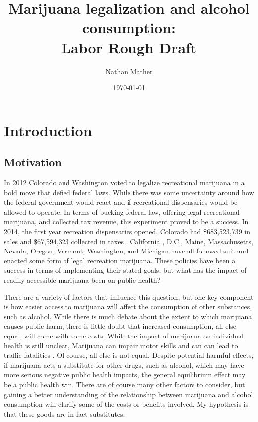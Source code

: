 \documentclass[11pt]{article}
\title{Marijuana legalization and alcohol consumption:\\
	Labor Rough Draft} %
\author{Nathan Mather} %
\date{\today} %
\begin{document}
	
	
\maketitle %

\setcounter{tocdepth}{3} %

\tableofcontents %

\section{Introduction}

\subsection{Motivation}

In 2012 Colorado and Washington voted to legalize recreational marijuana in a bold move that defied federal laws.  While there was some uncertainty around how the federal government would react and if recreational dispensaries would be allowed to operate. In terms of bucking federal law, offering legal recreational marijuana, and collected tax revenue, this experiment proved to be a success. In 2014, the first year recreation dispensaries opened, Colorado had \$683,523,739 in sales and \$67,594,323 collected in taxes \cite{Colorado_marijuana_sales}. California , D.C., Maine, Massachusetts, Nevada, Oregon, Vermont, Washington, and Michigan have all followed suit and enacted some form of legal recreation marijuana. These policies have been a success in terms of implementing their stated goals, but what has the impact of readily accessible marijuana been on public health? \par

There are a variety of factors that influence this question, but one key component is how easier access to marijuana will affect the consumption of other substances, such as alcohol. While there is much debate about the extent to which marijuana causes public harm, there is little doubt that increased consumption, all else equal, will come with some costs. While the impact of marijuana on individual health is still unclear, Marijuana can impair motor skills and can can lead to traffic fatalities \cite{webmd_mj}. Of course, all else is not equal.  Despite potential harmful effects, if marijuana acts a substitute for other drugs, such as alcohol, which may have more serious negative public health impacts, the general equilibrium effect may be a public health win. There are of course many other factors to consider, but gaining a  better understanding of the relationship between marijuana and alcohol consumption will clarify some of the costs or benefits involved. My hypothesis is that these goods are in fact substitutes. 
\end{document}
